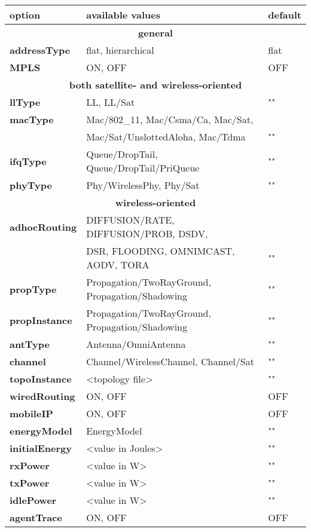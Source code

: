 \begin{table}[h]
\label{table:nodeconfig}
\begin{center} 
{\footnotesize
\begin{tabular}{|l|l|l|}\hline
{\bf option} & {\bf available values} & {\bf default}\\\hline\hline 
\multicolumn{3}{|c|}{\bf general} \\\hline
{\bf addressType} & flat, hierarchical & flat\\\hline
{\bf MPLS} & ON, OFF & OFF\\\hline
\multicolumn{3}{|c|}{\bf both satellite- and wireless-oriented} \\\hline
{\bf llType} & LL, LL/Sat & "" \\\hline
{\bf macType} & Mac/802\_11, Mac/Csma/Ca, Mac/Sat, & \\ 
& Mac/Sat/UnslottedAloha, Mac/Tdma & "" \\\hline
{\bf ifqType} & Queue/DropTail, Queue/DropTail/PriQueue & "" \\\hline
{\bf phyType} & Phy/WirelessPhy, Phy/Sat& "" \\\hline
\multicolumn{3}{|c|}{\bf wireless-oriented} \\\hline
{\bf adhocRouting} & DIFFUSION/RATE, DIFFUSION/PROB, DSDV, & \\
& DSR, FLOODING, OMNIMCAST, AODV, TORA & ""\\\hline
{\bf propType} & Propagation/TwoRayGround, Propagation/Shadowing & ""\\\hline
{\bf propInstance} & Propagation/TwoRayGround, Propagation/Shadowing & ""\\\hline
{\bf antType} & Antenna/OmniAntenna & ""\\\hline
{\bf channel} & Channel/WirelessChannel, Channel/Sat & ""\\\hline
{\bf topoInstance} & <topology file> & ""\\\hline
{\bf wiredRouting} & ON, OFF & OFF\\\hline
{\bf mobileIP} & ON, OFF& OFF \\\hline
{\bf energyModel} & EnergyModel & "" \\\hline
{\bf initialEnergy} & <value in Joules> & "" \\\hline
{\bf rxPower} & <value in W> & "" \\\hline
{\bf txPower} & <value in W> & "" \\\hline
{\bf idlePower} & <value in W> & "" \\\hline
{\bf agentTrace} & ON, OFF & OFF \\\hline

\end{tabular}}
\end{center}
\end{table}
